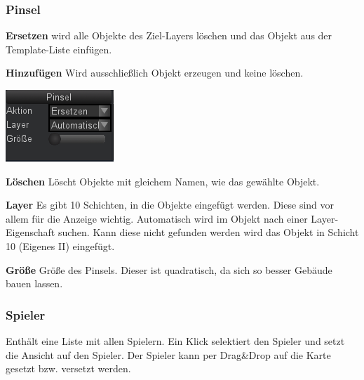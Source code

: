 \documentclass[german,10pt,a4paper,twocolumn,colorscheme=darkblue]{orarticle}
\begin{document}
		\subsubsection*{Pinsel}
			\begin{minipage}{0.49\linewidth}
			\textbf{Ersetzen} wird alle Objekte des Ziel-Layers löschen und das Objekt aus der Template-Liste einfügen.
			
			\textbf{Hinzufügen} Wird ausschließlich Objekt erzeugen und keine löschen.
			
			\end{minipage}\hspace{1em}
			\begin{minipage}{0.45\linewidth}
				\includegraphics[width=1.0\linewidth]{img/brush}
			\end{minipage}
			
			\textbf{Löschen} Löscht Objekte mit gleichem Namen, wie das gewählte Objekt.

			\textbf{Layer} Es gibt 10 Schichten, in die Objekte eingefügt werden. Diese sind vor allem für die Anzeige wichtig. Automatisch wird im Objekt nach einer Layer-Eigenschaft suchen. Kann diese nicht gefunden werden wird das Objekt in Schicht 10 (Eigenes II) eingefügt.
			
			\textbf{Größe} Größe des Pinsels. Dieser ist quadratisch, da sich so besser Gebäude bauen lassen.
		
		\subsubsection*{Spieler}
			Enthält eine Liste mit allen Spielern. Ein Klick selektiert den Spieler und setzt die Ansicht auf den Spieler. Der Spieler kann per Drag\&Drop auf die Karte gesetzt bzw. versetzt werden.
\end{document}
